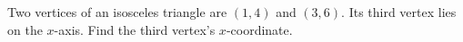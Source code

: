 Two vertices of an isosceles triangle are $(1,4)$ and $(3,6)$. Its third vertex lies on the $x$-axis. Find the third vertex's $x$-coordinate.
